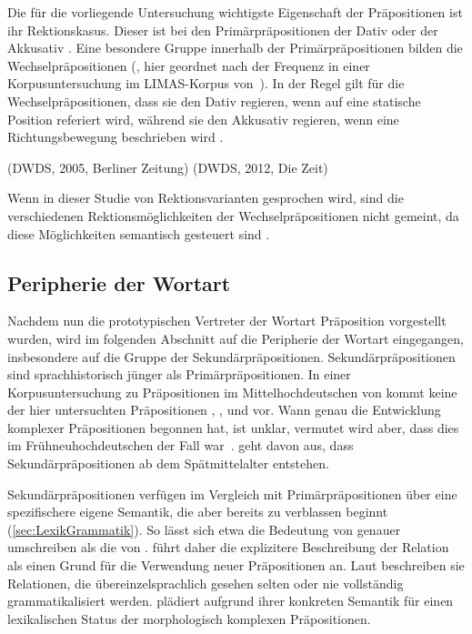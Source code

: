 Die für die vorliegende Untersuchung wichtigste Eigenschaft der Präpositionen ist ihr Rektionskasus. 
Dieser ist bei den Primärpräpositionen der Dativ oder der Akkusativ \citep[s.][94]{Szczepaniak2011}. 
Eine besondere Gruppe innerhalb der Primärpräpositionen bilden die Wechselpräpositionen  (\citealp[s.][§1439--1441]{Duden2022}, hier geordnet nach der Frequenz in einer Korpusuntersuchung im LIMAS-Korpus von~\citealp[19]{Folsom1984}). 
In der Regel gilt für die Wechselpräpositionen, dass sie den Dativ regieren, wenn auf eine statische Position referiert wird, während sie den Akkusativ regieren, wenn eine Richtungsbewegung beschrieben wird \citep[s.][§1439]{Duden2022}. 
\begin{exe}
\ex {} (DWDS, 2005, Berliner Zeitung) 
\ex {} (DWDS, 2012, Die Zeit)
\end{exe}
Wenn in dieser Studie von Rektionsvarianten gesprochen wird, sind die verschiedenen Rektionsmöglichkeiten der Wechselpräpositionen nicht gemeint, da diese Möglichkeiten semantisch gesteuert sind \citep[s.][703]{Engel1988}.
\subsection{Peripherie der Wortart}
\label{sec:Sekundaer}
Nachdem nun die prototypischen Vertreter der Wortart Präposition vorgestellt wurden, wird im folgenden Abschnitt auf die Peripherie der Wortart eingegangen, insbesondere auf die Gruppe der Sekundärpräpositionen. 
Sekundärpräpositionen sind sprachhistorisch jünger als Primärpräpositionen. 
In einer Korpusuntersuchung zu Präpositionen im Mittelhochdeutschen von \citet[]{Waldenberger.2009} kommt keine der hier untersuchten Pr{\"a}positionen , ,  und  vor. 
Wann genau die Entwicklung komplexer Pr{\"a}positionen begonnen hat, ist unklar, vermutet wird aber, dass dies im Fr{\"u}hneuhochdeutschen der Fall war~\citep[s.][50]{Meibauer1995}. 
\citet[43]{Romare.2004} geht davon aus, dass Sekundärpräpositionen ab dem Sp{\"a}tmittelalter entstehen. 

Sekundärpräpositionen verfügen im Vergleich mit Primärpräpositionen über eine spezifischere eigene Semantik, die aber bereits zu verblassen beginnt (\autoref{sec:LexikGrammatik}). 
So lässt sich etwa die Bedeutung von  genauer umschreiben als die von . 
\citet[42--43]{Bene.1975} f{\"u}hrt daher die explizitere Beschreibung der Relation als einen Grund f{\"u}r die Verwendung neuer Pr{\"a}positionen an. 
Laut \citet[67]{Diewald.1997} beschreiben sie Relationen, {\glqq}die übereinzelsprachlich gesehen selten oder nie vollst{\"a}ndig grammatikalisiert werden{\grqq}. 
\citet{Eisenberg1979} pl{\"a}diert aufgrund ihrer konkreten Semantik f{\"u}r einen lexikalischen Status der morphologisch komplexen Pr{\"a}positionen.

